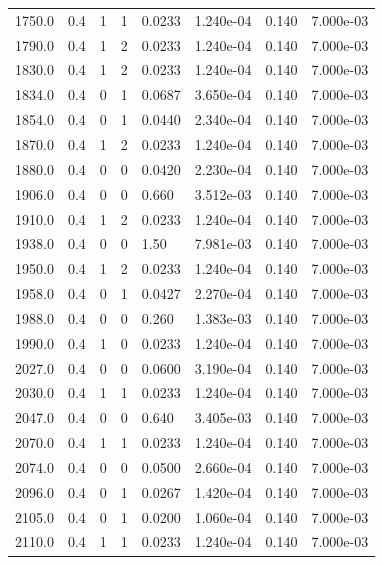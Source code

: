 \documentclass[preview]{standalone}
\begin{document}
{{{{{\begin{tabular}{L{1.2cm}C{1.2cm} C{0.3cm}C{0.5cm} C{1.4cm}C{1.4cm} C{1.4cm}C{1.4cm}}
  1750.0  &   0.4  & 1     &  1 &  0.0233  & 1.240e-04  & 0.140 &  7.000e-03   \\ 
  1790.0  &   0.4  & 1     &  2 &  0.0233  & 1.240e-04  & 0.140 &  7.000e-03   \\ 
  1830.0  &   0.4  & 1     &  2 &  0.0233  & 1.240e-04  & 0.140 &  7.000e-03   \\ 
  1834.0  &   0.4  & 0     &  1 &  0.0687  & 3.650e-04  & 0.140 &  7.000e-03   \\ 
  1854.0  &   0.4  & 0     &  1 &  0.0440  & 2.340e-04  & 0.140 &  7.000e-03   \\ 
  1870.0  &   0.4  & 1     &  2 &  0.0233  & 1.240e-04  & 0.140 &  7.000e-03   \\ 
  1880.0  &   0.4  & 0     &  0 &  0.0420  & 2.230e-04  & 0.140 &  7.000e-03   \\ 
  1906.0  &   0.4  & 0     &  0 &  0.660  & 3.512e-03  & 0.140 &  7.000e-03   \\ 
  1910.0  &   0.4  & 1     &  2 &  0.0233  & 1.240e-04  & 0.140 &  7.000e-03   \\ 
  1938.0  &   0.4  & 0     &  0 &  1.50  & 7.981e-03  & 0.140 &  7.000e-03   \\ 
  1950.0  &   0.4  & 1     &  2 &  0.0233  & 1.240e-04  & 0.140 &  7.000e-03   \\ 
  1958.0  &   0.4  & 0     &  1 &  0.0427  & 2.270e-04  & 0.140 &  7.000e-03   \\ 
  1988.0  &   0.4  & 0     &  0 &  0.260  & 1.383e-03  & 0.140 &  7.000e-03   \\ 
  1990.0  &   0.4  & 1     &  0 &  0.0233  & 1.240e-04  & 0.140 &  7.000e-03   \\ 
  2027.0  &   0.4  & 0     &  0 &  0.0600  & 3.190e-04  & 0.140 &  7.000e-03   \\ 
  2030.0  &   0.4  & 1     &  1 &  0.0233  & 1.240e-04  & 0.140 &  7.000e-03   \\ 
  2047.0  &   0.4  & 0     &  0 &  0.640  & 3.405e-03  & 0.140 &  7.000e-03   \\ 
  2070.0  &   0.4  & 1     &  1 &  0.0233  & 1.240e-04  & 0.140 &  7.000e-03   \\ 
  2074.0  &   0.4  & 0     &  0 &  0.0500  & 2.660e-04  & 0.140 &  7.000e-03   \\ 
  2096.0  &   0.4  & 0     &  1 &  0.0267  & 1.420e-04  & 0.140 &  7.000e-03   \\ 
  2105.0  &   0.4  & 0     &  1 &  0.0200  & 1.060e-04  & 0.140 &  7.000e-03   \\ 
  2110.0  &   0.4  & 1     &  1 &  0.0233  & 1.240e-04  & 0.140 &  7.000e-03   \\ 

\end{tabular}}}}}}
\end{document}
